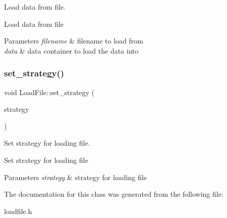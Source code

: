 Load data from file. 

Load data from file 
\begin{DoxyParams}{Parameters}
{\em filename} & filename to load from \\
\hline
{\em data} & data container to load the data into \\
\hline
\end{DoxyParams}
\mbox{\label{classLoadFile_a8cc361d8d1c29766dffeac4ada8d0258}} 
\subsubsection{\texorpdfstring{set\_strategy()}{set\_strategy()}}
{\footnotesize\ttfamily void Load\+File\+::set\+\_\+strategy (\begin{DoxyParamCaption}\item[{\mbox{\hyperlink{classLoadInterface}{Load\+Interface}} $\ast$}]{strategy }\end{DoxyParamCaption})\hspace{0.3cm}{\ttfamily [inline]}}



Set strategy for loading file. 

Set strategy for loading file 
\begin{DoxyParams}{Parameters}
{\em strategy} & strategy for loading file \\
\hline
\end{DoxyParams}


The documentation for this class was generated from the following file\+:\begin{DoxyCompactItemize}
\item 
loadfile.\+h\end{DoxyCompactItemize}
